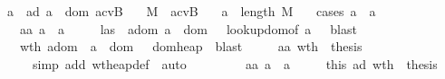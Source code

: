 \begin{isabellebody}
\ \ \isamarkupfalse \ a{\isacharprime}\ \isamarkupfalse \ ad{\isacharcolon}\ {\isachardoublequoteopen}a{\isacharprime}\ {\isasymin}\ dom\ {\isacharparenleft}{\isacharparenleft}a{\isacharcomma}{\isacharparenleft}cv{\isacharcomma}B{\isacharparenright}{\isacharparenright}{\isacharhash}{\isasymmu}{\isacharparenright}{\isachardoublequoteclose}\isanewline
\ \ \isamarkupfalse \ {\isacharquery}M{}\ {\isacharequal}\ {\isachardoublequoteopen}{\isacharparenleft}{\isacharparenleft}a{\isacharcomma}{\isacharparenleft}cv{\isacharcomma}B{\isacharparenright}{\isacharparenright}{\isacharhash}{\isasymmu}{\isacharparenright}{\isachardoublequoteclose}\isanewline
\ \ \isamarkupfalse \ {\isachardoublequoteopen}a{\isacharprime}\ {\isacharless}\ length\ {\isacharquery}M{}{\isachardoublequoteclose}\isanewline
\ \ \isamarkupfalse \ {\isacharparenleft}cases\ {\isachardoublequoteopen}a{\isacharprime}\ {\isacharequal}\ a{\isachardoublequoteclose}{\isacharparenright}\isanewline
\ \ \ \ \isamarkupfalse \ aa{\isacharcolon}\ {\isachardoublequoteopen}a{\isacharprime}\ {\isacharequal}\ a{\isachardoublequoteclose}\isanewline
\ \ \ \ \isamarkupfalse \ las\ \isamarkupfalse \ adom{\isacharcolon}\ {\isachardoublequoteopen}a\ {\isasymin}\ dom\ {\isasymSigma}{\isachardoublequoteclose}\ \isamarkupfalse \ lookup{\isacharunderscore}dom{\isacharbrackleft}of\ a\ {\isasymSigma}{\isacharbrackright}\ \isamarkupfalse \ blast\isanewline
\ \ \ \ \isamarkupfalse \ wth\ adom\ \isamarkupfalse \ {\isachardoublequoteopen}a\ {\isasymin}\ dom\ {\isasymmu}{\isachardoublequoteclose}\ \isamarkupfalse \ dom{\isacharunderscore}heap\ \isamarkupfalse \ blast\isanewline
\ \ \ \ \isamarkupfalse \ aa\ wth\ \isamarkupfalse \ {\isacharquery}thesis\ \isanewline
\ \ \ \ \ \ \isamarkupfalse \ {\isacharparenleft}simp\ add{\isacharcolon}\ wt{\isacharunderscore}heap{\isacharunderscore}def{\isacharparenright}\ \isamarkupfalse \ auto\ \isamarkupfalse \isanewline
\ \ \isamarkupfalse \isanewline
\ \ \ \ \isamarkupfalse \ aa{\isacharcolon}\ {\isachardoublequoteopen}a{\isacharprime}\ {\isasymnoteq}\ a{\isachardoublequoteclose}\isanewline
\ \ \ \ \isamarkupfalse \ this\ ad\ wth\ \isamarkupfalse \ {\isacharquery}thesis\ \isanewline

\end{isabellebody}
